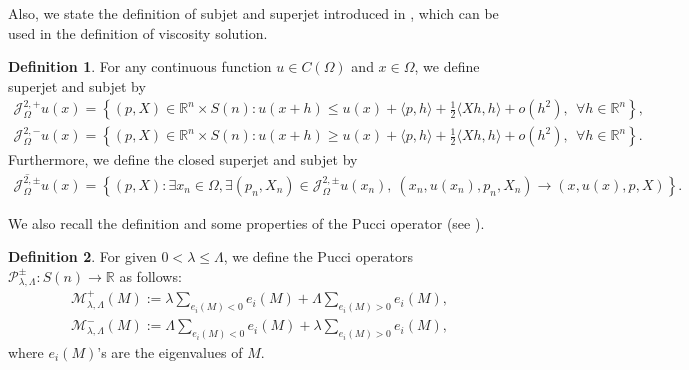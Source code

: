 \documentclass[reqno]{amsart}
\theoremstyle{plain}
\theoremstyle{definition}
\newtheorem{defn}{Definition}[section]
\theoremstyle{remark}
\numberwithin{equation}{section}
\begin{document}
Also, we state the definition of subjet and superjet introduced in \cite{Ishii92}, which can be used in the definition of viscosity solution.
\begin{defn}
    For any continuous function $u \in C(\Omega)$ and $x \in \Omega$, we define superjet and subjet by
    \begin{align*}
        \mathcal{J}^{2,+}_\Omega u(x) = \left\{ (p,X) \in \mathbb{R}^n \times S(n) : u(x+h) \leq u(x) + \langle p, h \rangle  + \frac{1}{2} \langle Xh, h\rangle +o(h^2), \ \ \forall h \in \mathbb{R}^n \right\}, \\
        \mathcal{J}^{2,-}_\Omega u(x) = \left\{ (p,X) \in \mathbb{R}^n \times S(n) : u(x+h) \geq u(x) + \langle p, h \rangle  + \frac{1}{2} \langle Xh, h\rangle +o(h^2), \ \ \forall h \in \mathbb{R}^n \right\}.
    \end{align*}
    Furthermore, we define the closed superjet and subjet by
    \begin{align*}
        \overline{\mathcal{J}^{2,\pm}_\Omega} u(x) = \left\{ (p,X)  : \exists x_n \in \Omega, \exists (p_n,X_n) \in \mathcal{J}^{2,\pm}_\Omega u(x_n), \ (x_n, u(x_n),p_n,X_n) \rightarrow (x,u(x),p,X)\right\}.
    \end{align*}
\end{defn}
We also recall the definition and some properties of the Pucci operator (see \cite{Caffarelli95}).
\begin{defn}
    For given $0<\lambda \leq \Lambda$, we define the Pucci operators $\mathcal{P}_{\lambda,\Lambda}^{\pm} : S(n) \rightarrow \mathbb{R}$ as follows:
\begin{align*}
    \mathcal{M}_{\lambda,\Lambda}^{+}(M) := \lambda \sum_{e_i(M)<0}e_i(M) + \Lambda \sum_{e_i(M)>0}e_i(M), \\
    \mathcal{M}_{\lambda,\Lambda}^{-}(M) := \Lambda \sum_{e_i(M)<0}e_i(M) + \lambda \sum_{e_i(M)>0}e_i(M),
\end{align*}
where $e_i(M)$'s are the eigenvalues of $M$.
\end{defn}
\end{document}
